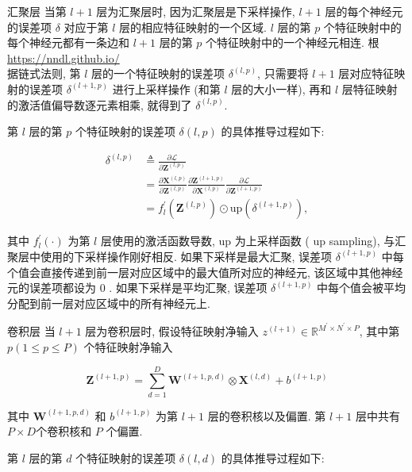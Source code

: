 \documentclass[10pt]{article}
\begin{document}
汇聚层 当第 $l+1$ 层为汇聚层时, 因为汇聚层是下采样操作, $l+1$ 层的每个神经元的误差项 $\delta$ 对应于第 $l$ 层的相应特征映射的一个区域. $l$ 层的第 $p$ 个特征映射中的每个神经元都有一条边和 $l+1$ 层的第 $p$ 个特征映射中的一个神经元相连. 根 \href{https://nndl.github.io/}{https://nndl.github.io/}\\
据链式法则, 第 $l$ 层的一个特征映射的误差项 $\delta^{(l, p)}$, 只需要将 $l+1$ 层对应特征映射的误差项 $\delta^{(l+1, p)}$ 进行上采样操作 (和第 $l$ 层的大小一样), 再和 $l$ 层特征映射的激活值偏导数逐元素相乘, 就得到了 $\delta^{(l, p)}$.

第 $l$ 层的第 $p$ 个特征映射的误差项 $\delta(l, p)$ 的具体推导过程如下:


\begin{align*}
\delta^{(l, p)} & \triangleq \frac{\partial \mathcal{L}}{\partial \boldsymbol{Z}^{(l, p)}}  \tag{5.32}\\
& =\frac{\partial \boldsymbol{X}^{(l, p)}}{\partial \boldsymbol{Z}^{(l, p)}} \frac{\partial \boldsymbol{Z}^{(l+1, p)}}{\partial \boldsymbol{X}^{(l, p)}} \frac{\partial \mathcal{L}}{\partial \boldsymbol{Z}^{(l+1, p)}}  \tag{5.33}\\
& =f_{l}^{\prime}\left(\boldsymbol{Z}^{(l, p)}\right) \odot \mathrm{up}\left(\delta^{(l+1, p)}\right), \tag{5.34}
\end{align*}


其中 $f_{l}^{\prime}(\cdot)$ 为第 $l$ 层使用的激活函数导数, up 为上采样函数 ( up sampling), 与汇聚层中使用的下采样操作刚好相反. 如果下采样是最大汇聚, 误差项 $\delta^{(l+1, p)}$ 中每个值会直接传递到前一层对应区域中的最大值所对应的神经元, 该区域中其他神经元的误差项都设为 0 . 如果下采样是平均汇聚, 误差项 $\delta^{(l+1, p)}$ 中每个值会被平均分配到前一层对应区域中的所有神经元上.

卷积层 当 $l+1$ 层为卷积层时, 假设特征映射净输入 $z^{(l+1)} \in \mathbb{R}^{M^{\prime} \times N^{\prime} \times P}$, 其中第 $p(1 \leq p \leq P)$ 个特征映射净输入


\begin{equation*}
\boldsymbol{Z}^{(l+1, p)}=\sum_{d=1}^{D} \boldsymbol{W}^{(l+1, p, d)} \otimes \boldsymbol{X}^{(l, d)}+b^{(l+1, p)} \tag{5.35}
\end{equation*}


其中 $\boldsymbol{W}^{(l+1, p, d)}$ 和 $b^{(l+1, p)}$ 为第 $l+1$ 层的卷积核以及偏置. 第 $l+1$ 层中共有 $P \times D$个卷积核和 $P$ 个偏置.

第 $l$ 层的第 $d$ 个特征映射的误差项 $\delta(l, d)$ 的具体推导过程如下:
\end{document}
